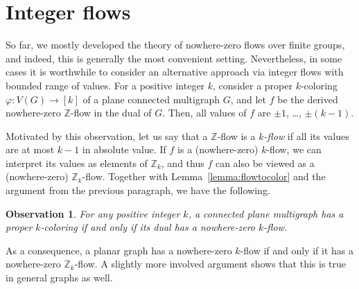 \documentclass[12pt,twoside,openright,a4paper]{book}
\newtheorem{observation}[theorem]{Observation}
\begin{document}
\section{Integer flows}

So far, we mostly developed the theory of nowhere-zero flows over finite groups, and indeed, this is generally
the most convenient setting.  Nevertheless, in some cases it is worthwhile to consider an alternative approach
via integer flows with bounded range of values.  For a positive integer $k$, consider a proper $k$-coloring $\varphi:V(G)\to [k]$
of a plane connected multigraph $G$, and let $f$ be the derived nowhere-zero $\mathbb{Z}$-flow in the dual of $G$.
Then, all values of $f$ are $\pm 1$, \ldots, $\pm (k-1)$.

Motivated by this observation, let us say that a $\mathbb{Z}$-flow is a \emph{$k$-flow} if all its values are at most $k-1$ in absolute value.
If $f$ is a (nowhere-zero) $k$-flow, we can interpret its values as elements of $\mathbb{Z}_k$, and thus $f$ can also be viewed as a (nowhere-zero)
$\mathbb{Z}_k$-flow.  Together with Lemma~\ref{lemma:flowtocolor} and the argument from the previous paragraph,
we have the following.
\begin{observation}\label{obs:flowcol}
For any positive integer $k$, a connected plane multigraph has a proper $k$-coloring if and only if its dual has a nowhere-zero $k$-flow.
\end{observation}
As a consequence, a planar graph has a nowhere-zero $k$-flow if and only if it has a nowhere-zero $\mathbb{Z}_k$-flow.
A slightly more involved argument shows that this is true in general graphs as well.
\end{document}
